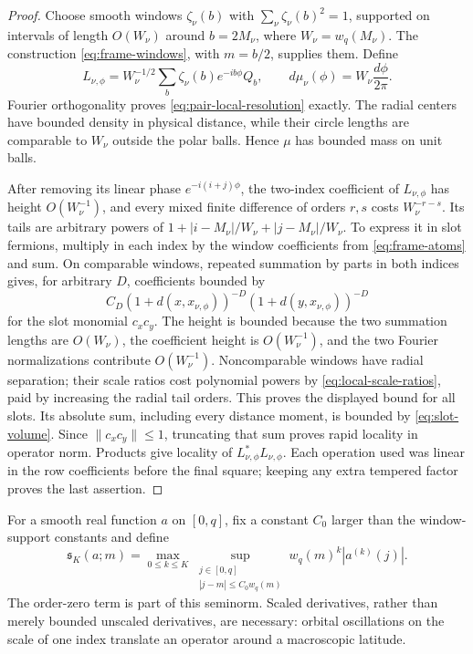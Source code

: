 \begin{proof}
Choose smooth windows $\zeta_\nu(b)$ with
$\sum_\nu\zeta_\nu(b)^2=1$, supported on intervals of length
$O(W_\nu)$ around $b=2M_\nu$, where $W_\nu=w_q(M_\nu)$.
The construction \eqref{eq:frame-windows}, with $m=b/2$, supplies
them.  Define
\begin{equation}
 L_{\nu,\phi}=W_\nu^{-1/2}
        \sum_b\zeta_\nu(b)e^{-ib\phi}Q_b,
 \qquad d\mu_\nu(\phi)=W_\nu\frac{d\phi}{2\pi}.
 \label{eq:fourier-pair-localization}
\end{equation}
Fourier orthogonality proves \eqref{eq:pair-local-resolution} exactly.
The radial centers have bounded density in physical distance, while
their circle lengths are comparable to $W_\nu$ outside the polar
balls.  Hence $\mu$ has bounded mass on unit balls.

After removing its linear phase $e^{-i(i+j)\phi}$, the two-index
coefficient of $L_{\nu,\phi}$ has height $O(W_\nu^{-1})$,
and every mixed finite difference of orders $r,s$ costs
$W_\nu^{-r-s}$.  Its tails are arbitrary powers of
$1+|i-M_\nu|/W_\nu+|j-M_\nu|/W_\nu$.
To express it in slot fermions, multiply in each index by the window
coefficients from \eqref{eq:frame-atoms} and sum.  On comparable
windows, repeated summation by parts in both indices gives, for arbitrary $D$, coefficients
bounded by
\[
 C_D(1+d(x,x_{\nu,\phi}))^{-D}
       (1+d(y,x_{\nu,\phi}))^{-D}
\]
for the slot monomial $c_xc_y$.  The height is bounded because the
two summation lengths are $O(W_\nu)$, the coefficient height is
$O(W_\nu^{-1})$, and the two Fourier normalizations contribute
$O(W_\nu^{-1})$.  Noncomparable windows have radial separation;
their scale ratios cost polynomial powers by
\eqref{eq:local-scale-ratios}, paid by increasing the radial tail
orders.  This proves the displayed bound for all slots.  Its absolute
sum, including every distance moment, is bounded by
\eqref{eq:slot-volume}.  Since $\|c_xc_y\|\leq1$, truncating that
sum proves rapid locality in operator norm.  Products give locality
of $L_{\nu,\phi}^*L_{\nu,\phi}$.  Each operation used was linear in
the row coefficients before the final square; keeping any extra
tempered factor proves the last assertion.
\end{proof}

For a smooth real function $a$ on $[0,q]$, fix a constant $C_0$
larger than the window-support constants and define
\begin{equation}
 \mathfrak s_K(a;m)=\max_{0\leq k\leq K}
   \sup_{\substack{j\in[0,q]\\|j-m|\leq C_0w_q(m)}}
       w_q(m)^k|a^{(k)}(j)|.
 \label{eq:diagonal-symbol-seminorm}
\end{equation}
The order-zero term is part of this seminorm.  Scaled derivatives,
rather than merely bounded unscaled derivatives, are necessary:
orbital oscillations on the scale of one index translate an operator
around a macroscopic latitude.

